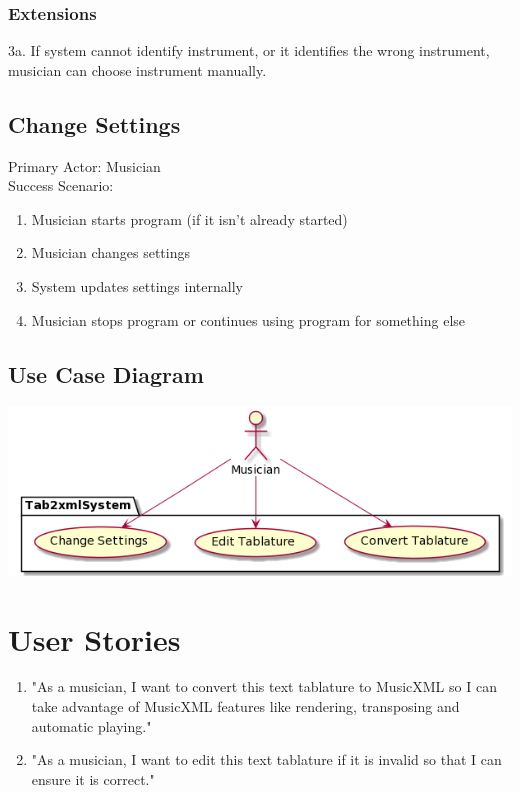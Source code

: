 \documentclass[11pt]{article}
\begin{document}
\subsubsection{Extensions}
\label{sec:org5f946a2}
3a. If system cannot identify instrument, or it identifies the wrong instrument, musician can choose instrument manually. \\
\subsection{Change Settings}
\label{sec:orgb69dc52}
Primary Actor: Musician \\
Success Scenario:
\begin{enumerate}
\item Musician starts program (if it isn't already started)
\item Musician changes settings
\item System updates settings internally
\item Musician stops program or continues using program for something else
\end{enumerate}
\subsection{Use Case Diagram}
\label{sec:org1d3b5f7}
\begin{center}
\includegraphics[width=.9\linewidth]{./Diagrams/use-case-diagram.png}
\end{center}
\section{User Stories}
\label{sec:org309db6f}
\begin{enumerate}
\item "As a musician, I want to convert this text tablature to MusicXML so I can take advantage of MusicXML features like rendering, transposing and automatic playing."
\item "As a musician, I want to edit this text tablature if it is invalid so that I can ensure it is correct."
\end{enumerate}
\end{document}
